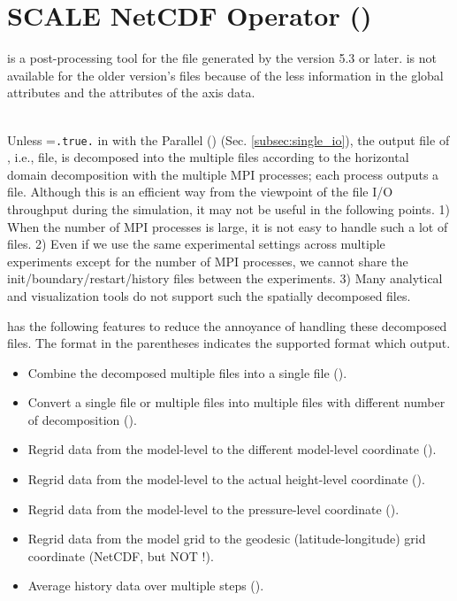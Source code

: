 \section{SCALE NetCDF Operator (\sno)} \label{sec:sno}

 \hrulefill

\sno is a post-processing tool for the \scalenetcdf file generated by the \scalelib version 5.3 or later.
\sno is not available for the older version's \scalenetcdf files
because of the less information in the global attributes and the attributes of the axis data.

\noindent \hrulefill\\


Unless =\verb|.true.| in  with the Parallel \netcdf (\pnetcdf) (Sec. \ref{subsec:single_io}),
the output file of \scalerm, i.e., \scalenetcdf file, is decomposed into the multiple files
according to the horizontal domain decomposition with the multiple MPI processes; each process outputs a file.
Although this is an efficient way from the viewpoint of the file I/O throughput during the simulation,
it may not be useful in the following points.
%
1) When the number of MPI processes is large, it is not easy to handle such a lot of files.
2) Even if we use the same experimental settings across multiple experiments except for the number of MPI processes, we cannot share the init/boundary/restart/history files between the experiments.
3) Many analytical and visualization tools do not support such the spatially decomposed files.


\sno has the following features to reduce the annoyance of handling these decomposed files.
The format in the parentheses indicates the supported format which \sno output.
\begin{itemize}
 \item Combine the decomposed multiple files into a single file (\scalenetcdf).
 \item Convert a single file or multiple files into multiple files with different number of decomposition (\scalenetcdf).
 \item Regrid data from the model-level to the different model-level coordinate (\scalenetcdf).
 \item Regrid data from the model-level to the actual height-level coordinate (\scalenetcdf).
 \item Regrid data from the model-level to the pressure-level coordinate (\scalenetcdf).
 \item Regrid data from the model grid to the geodesic (latitude-longitude) grid coordinate (NetCDF, but NOT \scalenetcdf !).
 \item Average history data over multiple steps (\scalenetcdf).
\end{itemize}



